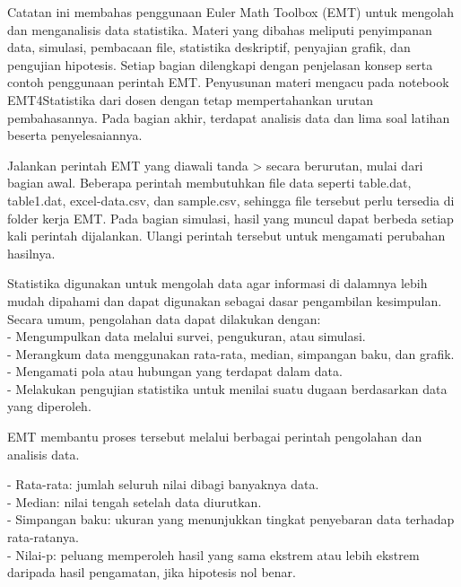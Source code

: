 \documentclass[a4paper,10pt]{article}
\begin{document}
\begin{eulernotebook}
\begin{eulercomment}
Catatan ini membahas penggunaan Euler Math Toolbox (EMT) untuk
mengolah dan menganalisis data statistika. Materi yang dibahas
meliputi penyimpanan data, simulasi, pembacaan file, statistika
deskriptif, penyajian grafik, dan pengujian hipotesis. Setiap bagian
dilengkapi dengan penjelasan konsep serta contoh penggunaan perintah
EMT. Penyusunan materi mengacu pada notebook EMT4Statistika dari dosen
dengan tetap mempertahankan urutan pembahasannya. Pada bagian akhir,
terdapat analisis data dan lima soal latihan beserta penyelesaiannya.

\begin{eulercomment}
\begin{eulercomment}
Jalankan perintah EMT yang diawali tanda \textgreater{} secara berurutan, mulai
dari bagian awal. Beberapa perintah membutuhkan file data seperti
table.dat, table1.dat, excel-data.csv, dan sample.csv, sehingga file
tersebut perlu tersedia di folder kerja EMT. Pada bagian simulasi,
hasil yang muncul dapat berbeda setiap kali perintah dijalankan.
Ulangi perintah tersebut untuk mengamati perubahan hasilnya.

\begin{eulercomment}
\begin{eulercomment}
Statistika digunakan untuk mengolah data agar informasi di dalamnya
lebih mudah dipahami dan dapat digunakan sebagai dasar pengambilan
kesimpulan. Secara umum, pengolahan data dapat dilakukan dengan:\\
- Mengumpulkan data melalui survei, pengukuran, atau simulasi.\\
- Merangkum data menggunakan rata-rata, median, simpangan baku, dan
grafik.\\
- Mengamati pola atau hubungan yang terdapat dalam data.\\
- Melakukan pengujian statistika untuk menilai suatu dugaan
berdasarkan data yang diperoleh.

EMT membantu proses tersebut melalui berbagai perintah pengolahan dan
analisis data.

\end{eulercomment}
\begin{eulercomment}
- Rata-rata: jumlah seluruh nilai dibagi banyaknya data.\\
- Median: nilai tengah setelah data diurutkan.\\
- Simpangan baku: ukuran yang menunjukkan tingkat penyebaran data
terhadap rata-ratanya.\\
- Nilai-p: peluang memperoleh hasil yang sama ekstrem atau lebih
ekstrem daripada hasil pengamatan, jika hipotesis nol benar.


\end{eulercomment}
\end{eulercomment}
\end{eulercomment}
\end{eulercomment}
\end{eulercomment}
\end{eulernotebook}
\end{document}
